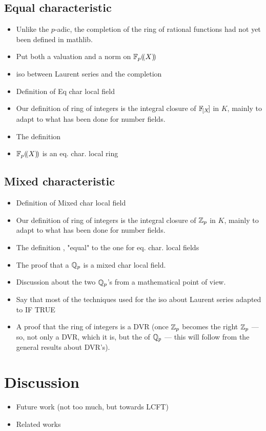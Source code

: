 \documentclass[sigplan,10pt,anonymous,review]{acmart}\settopmatter{printfolios=true,printccs=false,printacmref=false}
\begin{document}
\subsection{Equal characteristic}
\begin{itemize}
\item Unlike the $p$-adic, the completion of the ring of rational functions had not yet been defined in mathlib.
\item Put both a valuation and a norm on ${\mathbb{F}_{p}}(\!(X)\!)$
\item iso between Laurent series and the completion
\item Definition of Eq char local field
\item Our definition of ring of integers is the integral closure of $\powerseries$ in $K$, mainly to adapt to what has been done for number fields.
\item The definition 
\item ${\mathbb{F}_{p}}(\!(X)\!)$ is an eq. char. local ring 
\end{itemize}
\subsection{Mixed characteristic}
\begin{itemize}
\item Definition of Mixed char local field
\item Our definition of ring of integers is the integral closure of $\mathbb{Z}_p$ in $K$, mainly to adapt to what has been done for number fields.
\item The definition , "equal" to the one for eq. char. local fields
\item The proof that a $\mathbb{Q}_p$ is a mixed char local field.
\item Discussion about the two $\mathbb{Q}_p$'s from a mathematical point of view.
\item Say that most of the techniques used for the iso about Laurent series adapted to  IF TRUE
\item A proof that the ring of integers is a DVR (once $\mathbb{Z}_p$ becomes the right $\mathbb{Z}_p$ --- so, not only a DVR, which it is, but the  of $\mathbb{Q}_p$ --- this will follow from the general results about DVR's).
\end{itemize}


\section{Discussion}
\begin{itemize}
\item Future work (not too much, but towards LCFT)
\item Related works
\end{itemize}
\end{document}
